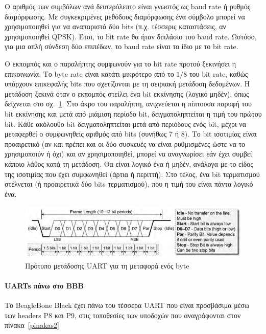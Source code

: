 \documentclass[12pt, a4paper, oneside]{report}
\begin{document}
Ο αριθμός των συμβόλων ανά δευτερόλεπτο είναι γνωστός ως baud rate ή ρυθμός διαμόρφωσης. Με συγκεκριμένες μεθόδους διαμόρφωσης ένα σύμβολο μπορεί να χρησιμοποιηθεί για να αναπαριστά δύο bits (π.χ. τέσσερις καταστάσεις, αν χρησιμοποιηθεί QPSK). Έτσι, το bit rate θα ήταν διπλάσιο του baud rate. Ωστόσο, για μια απλή σύνδεση δύο επιπέδων, το baud rate είναι το ίδιο με το bit rate.

Ο εκπομπός και ο παραλήπτης συμφωνούν για το bit rate προτού ξεκινήσει η επικοινωνία. Το byte rate είναι κατάτι μικρότερο από το $1/8$ του bit rate, καθώς υπάρχουν επικεφαλής bits που σχετίζονται με τη σειριακή μετάδοση δεδομένων. Η μετάδοση ξεκινά όταν ο εκπομπός στείλει ένα bit εκκίνησης (λογικό μηδέν), όπως δείχνεται στο σχ.~\ref{eik23}. Στο άκρο του παραλήπτη, ανιχνεύεται η πίπτουσα παρυφή του bit εκκίνησης και μετά από μιάμιση περίοδο bit, δειγματοληπτείται η τιμή του πρώτου bit. Κάθε ακόλουθο bit δειγματοληπτείται μετά από περιόδους ενός bit, μέχρι να μεταφερθεί ο συμφωνηθείς αριθμός από bits (συνήθως 7 ή 8). Το bit ισοτιμίας είναι προαιρετικό (αν και πρέπει και οι δύο συσκευές να είναι ρυθμισμένες ώστε να το χρησιμοποιύν ή όχι) και αν χρησιμοποιηθεί, μπορεί να αναγνωρίσει εάν έχει συμβεί κάποιο λάθος κατά τη μετάδοση. Θα είναι λογικό ένα ή μηδέν, ανάλογα με το είδος της ισοτιμίας που έχει συμφωνηθεί (άρτια ή περιττή). Στο τέλος, ένα bit τερματισμού στέλνεται (ή προαιρετικά δύο bits τερματισμού), που η τιμή του είναι πάντα λογικό ένα.

\begin{figure}
\centering
\includegraphics[width=\textwidth]{eikona_23}
\caption[Πρότυπο μετάδοσης UART για τη μεταφορά ενός byte]{Πρότυπο μετάδοσης UART για τη μεταφορά ενός byte\cite{46}}\label{eik23}
\end{figure}

\paragraph{UARTs πάνω στο BBB}

Το BeagleBone Black έχει πάνω του τέσσερα UART που είναι προσβάσιμα μέσω των headers P8 και P9, στις τοποθεσίες των υποδοχών που αναγράφονται στον πίνακα~\ref{pinakas2}
\end{document}
